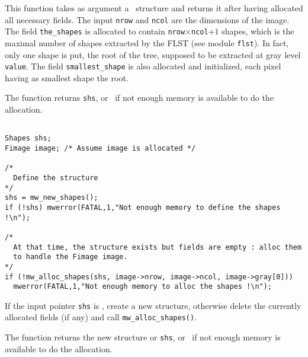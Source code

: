 
\Description
This function takes as argument a \shapes\ structure and returns it
after having allocated all necessary fields. The input \verb+nrow+ and 
\verb+ncol+ are the dimensions of the image. 
The field \verb+the_shapes+ is allocated to contain
\verb+nrow+$\times$\verb+ncol+$+1$ shapes, which is the maximal number of 
shapes extracted by the FLST (see module \verb+flst+). 
In fact, only one shape is put, the root of the tree, supposed to be 
extracted at gray level \verb+value+. 
The field \verb+smallest_shape+ is also allocated and
initialized, each pixel having as smallest shape the root.

The function returns \verb+shs+, or \Null\ if not enough memory is available
to do the allocation.

\Next
\Example
\begin{verbatim}

Shapes shs;
Fimage image; /* Assume image is allocated */

/*
  Define the structure
*/
shs = mw_new_shapes();
if (!shs) mwerror(FATAL,1,"Not enough memory to define the shapes !\n");

/* 
  At that time, the structure exists but fields are empty : alloc them
  to handle the Fimage image.
*/
if (!mw_alloc_shapes(shs, image->nrow, image->ncol, image->gray[0]))
  mwerror(FATAL,1,"Not enough memory to alloc the shapes !\n");

\end{verbatim}

\newpage %



\Description
If the input pointer \verb+shs+ is \Null, create a new
structure, otherwise delete the currently allocated fields 
(if any) and call \verb+mw_alloc_shapes()+.

The function returns the new structure or \verb+shs+, or \Null\ if not enough 
memory is available to do the allocation.

